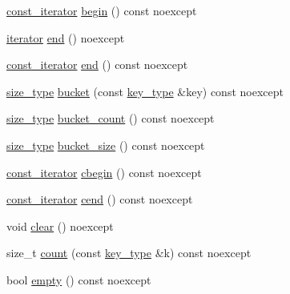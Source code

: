 \begin{DoxyCompactItemize}
\item 
\hyperlink{classtheoria_1_1util_1_1densemap_a8c2937f8e4ba47abf344d9f9f23f0c88}{const\+\_\+iterator} \hyperlink{classtheoria_1_1util_1_1densemap_a602ddf67e5b8c1dc4459f71a0c7273b5}{begin} () const noexcept
\item 
\hyperlink{classtheoria_1_1util_1_1densemap_a4ee170442110252d3033534246f9677f}{iterator} \hyperlink{classtheoria_1_1util_1_1densemap_a2aebd517ccb28817684c62afc67396f3}{end} () noexcept
\item 
\hyperlink{classtheoria_1_1util_1_1densemap_a8c2937f8e4ba47abf344d9f9f23f0c88}{const\+\_\+iterator} \hyperlink{classtheoria_1_1util_1_1densemap_a2f1d82722dd454f5804a28d76acc0986}{end} () const noexcept
\item 
\hyperlink{classtheoria_1_1util_1_1densemap_a133075e61db44e086c734c8a32ca6ab2}{size\+\_\+type} \hyperlink{classtheoria_1_1util_1_1densemap_a10f53552f9f880393cad9085ff9d5a23}{bucket} (const \hyperlink{classtheoria_1_1util_1_1densemap_afd285a46dc8f45b4b1556a656708d2a7}{key\+\_\+type} \&key) const noexcept
\item 
\hyperlink{classtheoria_1_1util_1_1densemap_a133075e61db44e086c734c8a32ca6ab2}{size\+\_\+type} \hyperlink{classtheoria_1_1util_1_1densemap_acb06213b8d862b1295c79752a2329fd6}{bucket\+\_\+count} () const noexcept
\item 
\hyperlink{classtheoria_1_1util_1_1densemap_a133075e61db44e086c734c8a32ca6ab2}{size\+\_\+type} \hyperlink{classtheoria_1_1util_1_1densemap_a4e82874d3fe3d61d5e9a9f7405531316}{bucket\+\_\+size} () const noexcept
\item 
\hyperlink{classtheoria_1_1util_1_1densemap_a8c2937f8e4ba47abf344d9f9f23f0c88}{const\+\_\+iterator} \hyperlink{classtheoria_1_1util_1_1densemap_a519f986513c0242d89cb97a36b587743}{cbegin} () const noexcept
\item 
\hyperlink{classtheoria_1_1util_1_1densemap_a8c2937f8e4ba47abf344d9f9f23f0c88}{const\+\_\+iterator} \hyperlink{classtheoria_1_1util_1_1densemap_a01965a6fe934583b09cb0812e673d64c}{cend} () const noexcept
\item 
void \hyperlink{classtheoria_1_1util_1_1densemap_ae087d2be9f5947d79522f6a3b592786e}{clear} () noexcept
\item 
size\+\_\+t \hyperlink{classtheoria_1_1util_1_1densemap_ad06bf0be6b547e08f57588c78cc8b3f6}{count} (const \hyperlink{classtheoria_1_1util_1_1densemap_afd285a46dc8f45b4b1556a656708d2a7}{key\+\_\+type} \&k) const noexcept
\item 
bool \hyperlink{classtheoria_1_1util_1_1densemap_aff92774c3fb8a22bef1178348845304f}{empty} () const noexcept

\end{DoxyCompactItemize}
